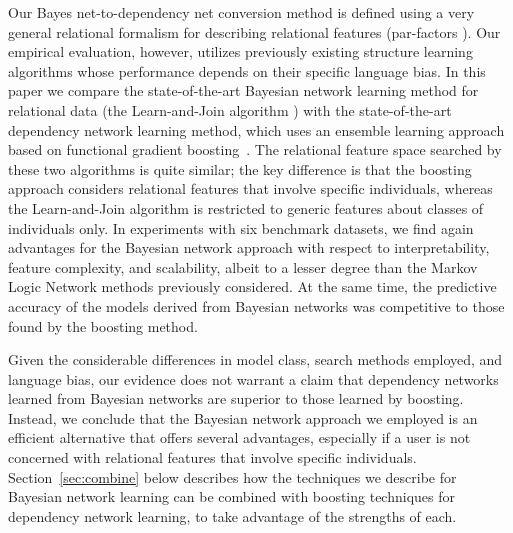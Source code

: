 \documentclass[runningheads,a4paper]{llncs}
\begin{document}
Our Bayes net-to-dependency net conversion method is defined using a very general relational formalism for describing relational features (par-factors \cite{Kimmig2014}). Our empirical evaluation, however, utilizes previously existing structure learning algorithms whose performance depends on their specific language bias. In this paper we compare the state-of-the-art Bayesian network learning method for relational data (the Learn-and-Join algorithm \cite{Schulte2012}) with the state-of-the-art dependency network learning method, which uses an ensemble learning approach based on functional gradient boosting~\cite{Natarajan2012}. The relational feature space searched by these two algorithms is quite similar; the key difference is that the boosting approach considers relational features that involve specific individuals, whereas the Learn-and-Join algorithm is restricted to generic features about classes of individuals only. In experiments with six benchmark datasets, we find again advantages for the Bayesian network approach with respect to interpretability, feature complexity, and scalability, albeit to a lesser degree than the Markov Logic Network methods previously considered. At the same time, the predictive accuracy of the models derived from Bayesian networks was competitive to those found by the boosting method. 

Given the considerable differences in model class, search methods employed, and language bias, our evidence does not warrant a claim that dependency networks learned from Bayesian networks are superior to those learned by boosting. Instead, we conclude that the  Bayesian network approach we employed is an efficient alternative that offers several advantages, especially if a user is not concerned with relational features that involve specific individuals. Section~\ref{sec:combine} below describes how  the techniques we describe for Bayesian network learning can be combined with boosting  techniques for dependency network learning, to take advantage of the strengths of each. 

%
\end{document}
